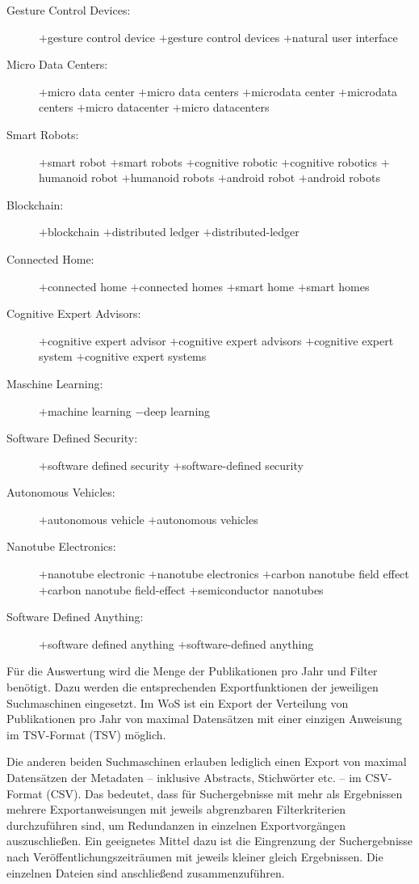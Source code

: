 \begin{description}
	\item[Gesture Control Devices:] $+$gesture control device $+$gesture control devices $+$natural user interface
	\item[Micro Data Centers:] $+$micro data center $+$micro data centers $+$microdata center $+$microdata centers $+$micro datacenter $+$micro datacenters
	\item[Smart Robots:] $+$smart robot $+$smart robots $+$cognitive robotic $+$cognitive robotics $+$humanoid robot  $+$humanoid robots $+$android robot $+$android robots
	\item[Blockchain:] $+$blockchain $+$distributed ledger $+$distributed-ledger
	\item[Connected Home:] $+$connected home $+$connected homes $+$smart home $+$smart homes
	\item[Cognitive Expert Advisors:] $+$cognitive expert advisor $+$cognitive expert advisors $+$cognitive expert system $+$cognitive expert systems
	\item[Maschine Learning:] $+$machine learning $-$deep learning
	\item[Software Defined Security:] $+$software defined security $+$software-defined security
	\item[Autonomous Vehicles:] $+$autonomous vehicle $+$autonomous vehicles
	\item[Nanotube Electronics:] $+$nanotube electronic $+$nanotube electronics $+$carbon nanotube field effect $+$carbon nanotube field-effect $+$semiconductor nanotubes
	\item[Software Defined Anything:] $+$software defined anything $+$software-defined anything
\end{description}

Für die Auswertung wird die Menge der Publikationen pro Jahr und Filter benötigt. Dazu werden die entsprechenden Exportfunktionen der jeweiligen Suchmaschinen eingesetzt. Im \ac{WoS} ist ein Export der Verteilung von Publikationen pro Jahr von maximal  Datensätzen mit einer einzigen Anweisung im \acs{TSV}-Format (\acl{TSV}) möglich.

Die anderen beiden Suchmaschinen erlauben lediglich einen Export von maximal  Datensätzen der Metadaten -- inklusive Abstracts, Stichwörter etc. -- im \acs{CSV}-Format (\acl{CSV}). Das bedeutet, dass für Suchergebnisse mit mehr als  Ergebnissen mehrere Exportanweisungen mit jeweils abgrenzbaren Filterkriterien durchzuführen sind, um Redundanzen in einzelnen Exportvorgängen auszuschließen. Ein geeignetes Mittel dazu ist die Eingrenzung der Suchergebnisse nach Ver\-öffentlichungs\-zeiträumen mit jeweils kleiner gleich  Ergebnissen. Die einzelnen Dateien sind anschließend zusammenzuführen.


